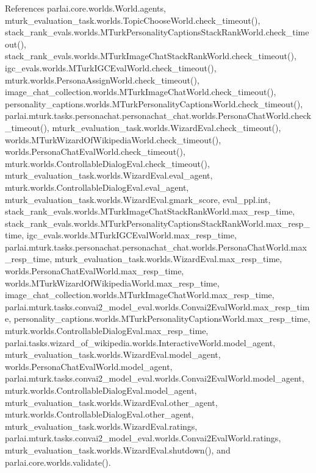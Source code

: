 References parlai.\+core.\+worlds.\+World.\+agents, mturk\+\_\+evaluation\+\_\+task.\+worlds.\+Topic\+Choose\+World.\+check\+\_\+timeout(), stack\+\_\+rank\+\_\+evals.\+worlds.\+M\+Turk\+Personality\+Captions\+Stack\+Rank\+World.\+check\+\_\+timeout(), stack\+\_\+rank\+\_\+evals.\+worlds.\+M\+Turk\+Image\+Chat\+Stack\+Rank\+World.\+check\+\_\+timeout(), igc\+\_\+evals.\+worlds.\+M\+Turk\+I\+G\+C\+Eval\+World.\+check\+\_\+timeout(), mturk.\+worlds.\+Persona\+Assign\+World.\+check\+\_\+timeout(), image\+\_\+chat\+\_\+collection.\+worlds.\+M\+Turk\+Image\+Chat\+World.\+check\+\_\+timeout(), personality\+\_\+captions.\+worlds.\+M\+Turk\+Personality\+Captions\+World.\+check\+\_\+timeout(), parlai.\+mturk.\+tasks.\+personachat.\+personachat\+\_\+chat.\+worlds.\+Persona\+Chat\+World.\+check\+\_\+timeout(), mturk\+\_\+evaluation\+\_\+task.\+worlds.\+Wizard\+Eval.\+check\+\_\+timeout(), worlds.\+M\+Turk\+Wizard\+Of\+Wikipedia\+World.\+check\+\_\+timeout(), worlds.\+Persona\+Chat\+Eval\+World.\+check\+\_\+timeout(), mturk.\+worlds.\+Controllable\+Dialog\+Eval.\+check\+\_\+timeout(), mturk\+\_\+evaluation\+\_\+task.\+worlds.\+Wizard\+Eval.\+eval\+\_\+agent, mturk.\+worlds.\+Controllable\+Dialog\+Eval.\+eval\+\_\+agent, mturk\+\_\+evaluation\+\_\+task.\+worlds.\+Wizard\+Eval.\+gmark\+\_\+score, eval\+\_\+ppl.\+int, stack\+\_\+rank\+\_\+evals.\+worlds.\+M\+Turk\+Image\+Chat\+Stack\+Rank\+World.\+max\+\_\+resp\+\_\+time, stack\+\_\+rank\+\_\+evals.\+worlds.\+M\+Turk\+Personality\+Captions\+Stack\+Rank\+World.\+max\+\_\+resp\+\_\+time, igc\+\_\+evals.\+worlds.\+M\+Turk\+I\+G\+C\+Eval\+World.\+max\+\_\+resp\+\_\+time, parlai.\+mturk.\+tasks.\+personachat.\+personachat\+\_\+chat.\+worlds.\+Persona\+Chat\+World.\+max\+\_\+resp\+\_\+time, mturk\+\_\+evaluation\+\_\+task.\+worlds.\+Wizard\+Eval.\+max\+\_\+resp\+\_\+time, worlds.\+Persona\+Chat\+Eval\+World.\+max\+\_\+resp\+\_\+time, worlds.\+M\+Turk\+Wizard\+Of\+Wikipedia\+World.\+max\+\_\+resp\+\_\+time, image\+\_\+chat\+\_\+collection.\+worlds.\+M\+Turk\+Image\+Chat\+World.\+max\+\_\+resp\+\_\+time, parlai.\+mturk.\+tasks.\+convai2\+\_\+model\+\_\+eval.\+worlds.\+Convai2\+Eval\+World.\+max\+\_\+resp\+\_\+time, personality\+\_\+captions.\+worlds.\+M\+Turk\+Personality\+Captions\+World.\+max\+\_\+resp\+\_\+time, mturk.\+worlds.\+Controllable\+Dialog\+Eval.\+max\+\_\+resp\+\_\+time, parlai.\+tasks.\+wizard\+\_\+of\+\_\+wikipedia.\+worlds.\+Interactive\+World.\+model\+\_\+agent, mturk\+\_\+evaluation\+\_\+task.\+worlds.\+Wizard\+Eval.\+model\+\_\+agent, worlds.\+Persona\+Chat\+Eval\+World.\+model\+\_\+agent, parlai.\+mturk.\+tasks.\+convai2\+\_\+model\+\_\+eval.\+worlds.\+Convai2\+Eval\+World.\+model\+\_\+agent, mturk.\+worlds.\+Controllable\+Dialog\+Eval.\+model\+\_\+agent, mturk\+\_\+evaluation\+\_\+task.\+worlds.\+Wizard\+Eval.\+other\+\_\+agent, mturk.\+worlds.\+Controllable\+Dialog\+Eval.\+other\+\_\+agent, mturk\+\_\+evaluation\+\_\+task.\+worlds.\+Wizard\+Eval.\+ratings, parlai.\+mturk.\+tasks.\+convai2\+\_\+model\+\_\+eval.\+worlds.\+Convai2\+Eval\+World.\+ratings, mturk\+\_\+evaluation\+\_\+task.\+worlds.\+Wizard\+Eval.\+shutdown(), and parlai.\+core.\+worlds.\+validate().

